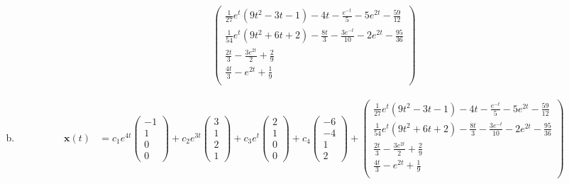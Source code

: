 \documentclass[10pt]{mypackage}
\begin{document}
\begin{solution}[8.3, Problem 35]
\begin{enumerate}[(a)]
\begin{align*}
\begin{pmatrix}
 \frac{1}{27} e^t \left(9 t^2-3 t-1\right)-4 t-\frac{e^{-t}}{5}-5 e^{2 t}-\frac{59}{12} \\
 \frac{1}{54} e^t \left(9 t^2+6 t+2\right)-\frac{8 t}{3}-\frac{3 e^{-t}}{10}-2 e^{2 t}-\frac{95}{36} \\
 \frac{2 t}{3}-\frac{3 e^{2 t}}{2}+\frac{2}{9} \\
 \frac{4 t}{3}-e^{2 t}+\frac{1}{9} \\
\end{pmatrix}
      \end{align*}
    \item 
      \begin{align*}
        \mathbf{x}(t) &= c_1e^{4t} \begin{pmatrix}-1\\1\\0\\0\end{pmatrix} + c_2 e^{3t} \begin{pmatrix}3\\1\\2\\1\end{pmatrix} + c_3e^{t} \begin{pmatrix}2\\1\\0\\0\end{pmatrix} + c_4 \begin{pmatrix}-6\\-4\\1\\2\end{pmatrix} + \begin{pmatrix}
 \frac{1}{27} e^t \left(9 t^2-3 t-1\right)-4 t-\frac{e^{-t}}{5}-5 e^{2 t}-\frac{59}{12} \\
 \frac{1}{54} e^t \left(9 t^2+6 t+2\right)-\frac{8 t}{3}-\frac{3 e^{-t}}{10}-2 e^{2 t}-\frac{95}{36} \\
 \frac{2 t}{3}-\frac{3 e^{2 t}}{2}+\frac{2}{9} \\
 \frac{4 t}{3}-e^{2 t}+\frac{1}{9} \\
\end{pmatrix}
      \end{align*}
  \end{enumerate}
\end{solution}
\end{document}
